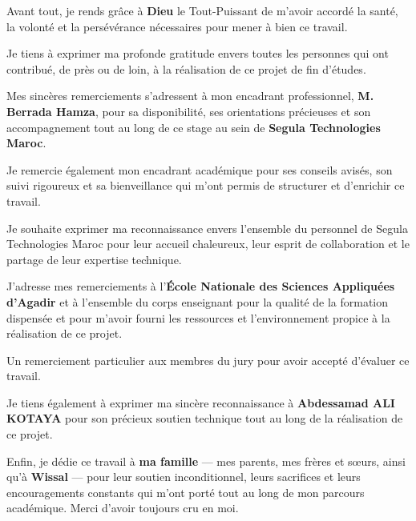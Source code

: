 
Avant tout, je rends grâce à \textbf{Dieu} le Tout-Puissant de m'avoir accordé la santé, la volonté et la persévérance nécessaires pour mener à bien ce travail.

Je tiens à exprimer ma profonde gratitude envers toutes les personnes qui ont contribué, de près ou de loin, à la réalisation de ce projet de fin d'études.

Mes sincères remerciements s'adressent à mon encadrant professionnel, \textbf{M. Berrada Hamza}, pour sa disponibilité, ses orientations précieuses et son accompagnement tout au long de ce stage au sein de \textbf{Segula Technologies Maroc}.

Je remercie également mon encadrant académique pour ses conseils avisés, son suivi rigoureux et sa bienveillance qui m'ont permis de structurer et d'enrichir ce travail.

Je souhaite exprimer ma reconnaissance envers l'ensemble du personnel de Segula Technologies Maroc pour leur accueil chaleureux, leur esprit de collaboration et le partage de leur expertise technique.

J'adresse mes remerciements à l'\textbf{École Nationale des Sciences Appliquées d'Agadir} et à l'ensemble du corps enseignant pour la qualité de la formation dispensée et pour m'avoir fourni les ressources et l'environnement propice à la réalisation de ce projet.

Un remerciement particulier aux membres du jury pour avoir accepté d'évaluer ce travail.

Je tiens également à exprimer ma sincère reconnaissance à \textbf{Abdessamad ALI KOTAYA} pour son précieux soutien technique tout au long de la réalisation de ce projet.

Enfin, je dédie ce travail à \textbf{ma famille} --- mes parents, mes frères et sœurs, ainsi qu'à \textbf{Wissal} --- pour leur soutien inconditionnel, leurs sacrifices et leurs encouragements constants qui m'ont porté tout au long de mon parcours académique. Merci d'avoir toujours cru en moi.

\MediaOptionLogicBlank